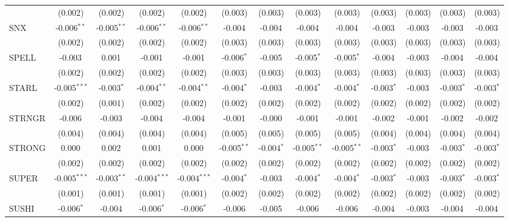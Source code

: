 \begin{table}[!htbp]
\begin{tabular}{@{\extracolsep{5pt}}lcccccccccccc}
  & (0.002) & (0.002) & (0.002) & (0.002) & (0.003) & (0.003) & (0.003) & (0.003) & (0.003) & (0.003) & (0.003) & (0.003) \\
 SNX & -0.006$^{**}$ & -0.005$^{**}$ & -0.006$^{**}$ & -0.006$^{**}$ & -0.004$^{}$ & -0.004$^{}$ & -0.004$^{}$ & -0.004$^{}$ & -0.003$^{}$ & -0.003$^{}$ & -0.003$^{}$ & -0.003$^{}$ \\
  & (0.002) & (0.002) & (0.002) & (0.002) & (0.003) & (0.003) & (0.003) & (0.003) & (0.003) & (0.003) & (0.003) & (0.003) \\
 SPELL & -0.003$^{}$ & 0.001$^{}$ & -0.001$^{}$ & -0.001$^{}$ & -0.006$^{*}$ & -0.005$^{}$ & -0.005$^{*}$ & -0.005$^{*}$ & -0.004$^{}$ & -0.003$^{}$ & -0.004$^{}$ & -0.004$^{}$ \\
  & (0.002) & (0.002) & (0.002) & (0.002) & (0.003) & (0.003) & (0.003) & (0.003) & (0.003) & (0.003) & (0.003) & (0.003) \\
 STARL & -0.005$^{***}$ & -0.003$^{*}$ & -0.004$^{**}$ & -0.004$^{**}$ & -0.004$^{*}$ & -0.003$^{}$ & -0.004$^{*}$ & -0.004$^{*}$ & -0.003$^{*}$ & -0.003$^{}$ & -0.003$^{*}$ & -0.003$^{*}$ \\
  & (0.002) & (0.001) & (0.002) & (0.002) & (0.002) & (0.002) & (0.002) & (0.002) & (0.002) & (0.002) & (0.002) & (0.002) \\
 STRNGR & -0.006$^{}$ & -0.003$^{}$ & -0.004$^{}$ & -0.004$^{}$ & -0.001$^{}$ & -0.000$^{}$ & -0.001$^{}$ & -0.001$^{}$ & -0.002$^{}$ & -0.001$^{}$ & -0.002$^{}$ & -0.002$^{}$ \\
  & (0.004) & (0.004) & (0.004) & (0.004) & (0.005) & (0.005) & (0.005) & (0.005) & (0.004) & (0.004) & (0.004) & (0.004) \\
 STRONG & 0.000$^{}$ & 0.002$^{}$ & 0.001$^{}$ & 0.000$^{}$ & -0.005$^{**}$ & -0.004$^{*}$ & -0.005$^{**}$ & -0.005$^{**}$ & -0.003$^{*}$ & -0.003$^{}$ & -0.003$^{*}$ & -0.003$^{*}$ \\
  & (0.002) & (0.002) & (0.002) & (0.002) & (0.002) & (0.002) & (0.002) & (0.002) & (0.002) & (0.002) & (0.002) & (0.002) \\
 SUPER & -0.005$^{***}$ & -0.003$^{**}$ & -0.004$^{***}$ & -0.004$^{***}$ & -0.004$^{*}$ & -0.003$^{}$ & -0.004$^{*}$ & -0.004$^{*}$ & -0.003$^{*}$ & -0.003$^{}$ & -0.003$^{*}$ & -0.003$^{*}$ \\
  & (0.001) & (0.001) & (0.001) & (0.001) & (0.002) & (0.002) & (0.002) & (0.002) & (0.002) & (0.002) & (0.002) & (0.002) \\
 SUSHI & -0.006$^{*}$ & -0.004$^{}$ & -0.006$^{*}$ & -0.006$^{*}$ & -0.006$^{}$ & -0.005$^{}$ & -0.006$^{}$ & -0.006$^{}$ & -0.004$^{}$ & -0.003$^{}$ & -0.004$^{}$ & -0.004$^{}$ \\

\end{tabular}
\end{table}
